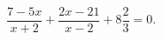 \begin{ex}[type=equation]
	\begin{condition}
		$\dfrac{7 - 5x}{x + 2} + \dfrac{2x - 21}{x - 2}+ 8\dfrac{2}{3} = 0.$
	\end{condition}
\end{ex}